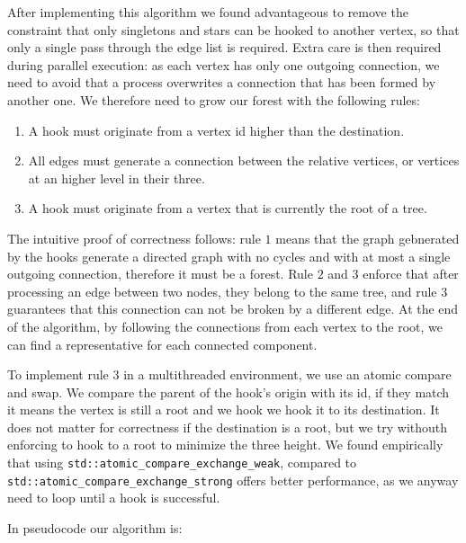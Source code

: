 After implementing this algorithm we found advantageous to remove the constraint
that only singletons and stars can be hooked to another vertex, so that only a single pass through
the edge list is required. Extra care is then required during parallel execution: as each vertex has only one outgoing
connection, we need to avoid that a process overwrites a connection that has been formed by another one.
We therefore need to grow our forest with the following rules:

\begin{enumerate}
    \item A hook must originate from a vertex id higher than the destination.
    \item All edges must generate a connection between the relative vertices, or vertices at an higher level in their three.
    \item A hook must originate from a vertex that is currently the root of a tree.
\end{enumerate}

The intuitive proof of correctness follows: rule $1$ means that the graph gebnerated by the
hooks generate a directed graph with no cycles and with at most a single outgoing connection, therefore it must be a forest.
Rule $2$ and $3$ enforce that after processing an edge between two nodes,
they belong to the same tree, and rule $3$ guarantees that this connection can not be broken by a different edge.
At the end of the algorithm, by following the connections from each vertex to the root, we can find a representative for each connected component.

To implement rule $3$ in a multithreaded environment, we use an atomic compare and swap.
We compare the parent of the hook's origin with its id, if they match it means the vertex is still a root and we
hook we hook it to its destination. It does not matter for correctness if the destination is a root, but we try withouth enforcing to
hook to a root to minimize the three height.
We found empirically that using \verb|std::atomic_compare_exchange_weak|,
compared to \verb|std::atomic_compare_exchange_strong| offers better performance, as we anyway need to loop until a hook is successful.


In pseudocode our algorithm is:
